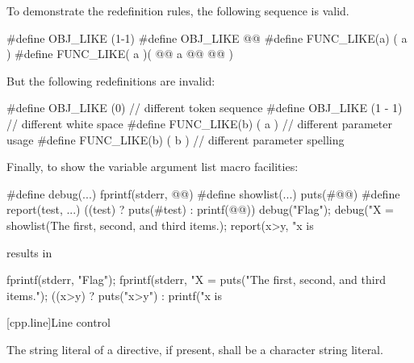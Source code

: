 \pnum
\begin{example}
To demonstrate the redefinition rules,
the following sequence is valid.

\begin{codeblock}
#define OBJ_LIKE      (1-1)
#define OBJ_LIKE      @@
#define FUNC_LIKE(a)   ( a )
#define FUNC_LIKE( a )(     @@
                a @@
                  @\tcode{*/}@ )
\end{codeblock}

But the following redefinitions are invalid:

\begin{codeblock}
#define OBJ_LIKE    (0)      // different token sequence
#define OBJ_LIKE    (1 - 1)  // different white space
#define FUNC_LIKE(b) ( a )   // different parameter usage
#define FUNC_LIKE(b) ( b )   // different parameter spelling
\end{codeblock}
\end{example}

\pnum
\begin{example}
Finally, to show the variable argument list macro facilities:

\begin{codeblock}
#define debug(...) fprintf(stderr, @@)
#define showlist(...) puts(#@@)
#define report(test, ...) ((test) ? puts(#test) : printf(@@))
debug("Flag");
debug("X = %
showlist(The first, second, and third items.);
report(x>y, "x is %
\end{codeblock}

results in

\begin{codeblock}
fprintf(stderr, "Flag");
fprintf(stderr, "X = %
puts("The first, second, and third items.");
((x>y) ? puts("x>y") : printf("x is %
  
\end{codeblock}
\end{example}

[cpp.line]{Line control}%
%

\pnum
The string literal of a
directive, if present,
shall be a character string literal.

